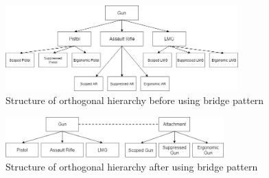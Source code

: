 \begin{figure}[H]
	\centering
	\includegraphics[width=0.8\textwidth]{assets/bridge-before}
	\caption{Structure of orthogonal hierarchy before using bridge pattern}
	\label{fig:bridge-before}
\end{figure}

\begin{figure}[H]
	\centering
	\includegraphics[width=0.75\textwidth]{assets/bridge-after}
	\caption{Structure of orthogonal hierarchy after using bridge pattern}
	\label{fig:bridge-after}
\end{figure}

